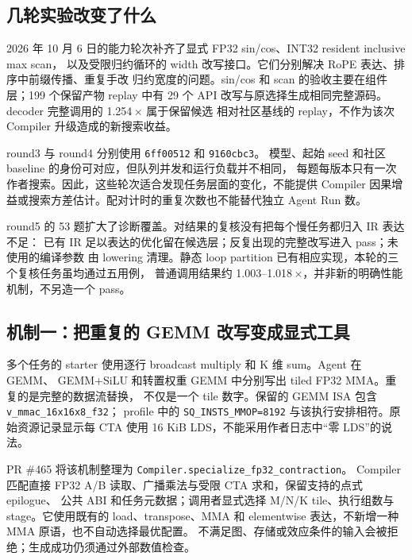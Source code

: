 \documentclass[UTF8,11pt,a4paper,fontset=none]{ctexart}
\newcommand{\code}[1]{\texttt{#1}}
\begin{document}
\subsection{几轮实验改变了什么}

2026 年 10 月 6 日的能力轮次补齐了显式 FP32 sin/cos、INT32 resident inclusive max scan，
以及受限归约循环的 width 改写接口。它们分别解决 RoPE 表达、排序中前缀传播、重复手改
归约宽度的问题。sin/cos 和 scan 的验收主要在组件层；199 个保留产物 replay 中有 29 个
API 改写与原选择生成相同完整源码。decoder 完整调用的 1.254\,$\times$ 属于保留候选
相对社区基线的 replay，不作为该次 Compiler 升级造成的新搜索收益\cite{bwtrig}。

round3 与 round4 分别使用 \code{6ff00512} 和 \code{9160cbc3}。
模型、起始 seed 和社区 baseline 的身份可对应，但队列并发和运行负载并不相同，
每题每版本只有一次作者搜索。因此，这些轮次适合发现任务层面的变化，不能提供
Compiler 因果增益或搜索方差估计。配对计时的重复次数也不能替代独立 Agent Run 数。

round5 的 53 题扩大了诊断覆盖。对结果的复核没有把每个慢任务都归入 IR 表达不足：
已有 IR 足以表达的优化留在候选层；反复出现的完整改写进入 pass；未使用的编译参数
由 lowering 清理。静态 loop partition 已有相应实现，本轮的三个复核任务虽均通过五用例，
普通调用结果约 1.003--1.018\,$\times$，并非新的明确性能机制，不另造一个 pass。

\subsection{机制一：把重复的 GEMM 改写变成显式工具}

多个任务的 starter 使用逐行 broadcast multiply 和 K 维 sum。Agent 在 GEMM、
GEMM+SiLU 和转置权重 GEMM 中分别写出 tiled FP32 MMA。重复的是完整的数据流替换，
不仅是一个 tile 数字。保留的 GEMM ISA 包含 \code{v\_mmac\_16x16x8\_f32}；
profile 中的 \code{SQ\_INSTS\_MMOP=8192} 与该执行安排相符。原始资源记录显示每 CTA
使用 16 KiB LDS，不能采用作者日志中“零 LDS”的说法\cite{bwmma}。

PR \#465 将该机制整理为 \code{Compiler.specialize\_fp32\_contraction}。
Compiler 匹配直接 FP32 A/B 读取、广播乘法与受限 CTA 求和，保留支持的点式 epilogue、
公共 ABI 和任务元数据；调用者显式选择 M/N/K tile、执行组数与 stage。它使用既有的
load、transpose、MMA 和 elementwise 表达，不新增一种 MMA 原语，也不自动选择最优配置。
不满足图、存储或效应条件的输入会被拒绝；生成成功仍须通过外部数值检查。
\end{document}
